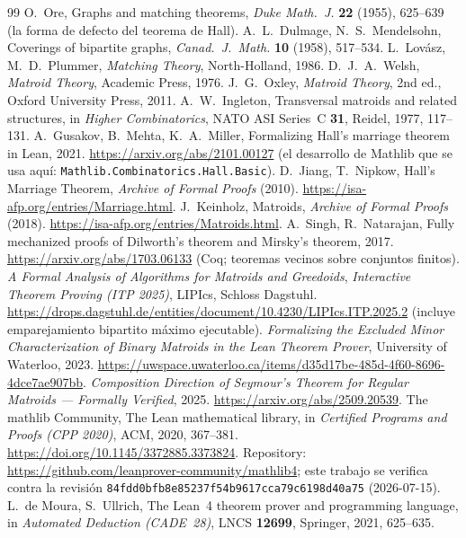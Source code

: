 \documentclass[11pt]{article}
\newcommand{\lean}[1]{\texttt{#1}}
\begin{document}
\begin{thebibliography}{99}
 O.~Ore, Graphs and matching theorems, \emph{Duke Math.\ J.} \textbf{22} (1955),
625--639 (la forma de defecto del teorema de Hall).
 A.~L.~Dulmage, N.~S.~Mendelsohn, Coverings of bipartite graphs, \emph{Canad.\ J.\
Math.} \textbf{10} (1958), 517--534.
 L.~Lov\'asz, M.~D.~Plummer, \emph{Matching Theory}, North-Holland, 1986.
\bibitem{welsh} D.~J.~A.~Welsh, \emph{Matroid Theory}, Academic Press, 1976.
\bibitem{oxley} J.~G.~Oxley, \emph{Matroid Theory}, 2nd ed., Oxford University Press, 2011.
\bibitem{ingleton} A.~W.~Ingleton, Transversal matroids and related structures, in \emph{Higher
Combinatorics}, NATO ASI Series~C \textbf{31}, Reidel, 1977, 117--131.
\bibitem{gusakov} A.~Gusakov, B.~Mehta, K.~A.~Miller, Formalizing Hall's marriage theorem in Lean,
2021. \url{https://arxiv.org/abs/2101.00127} (el desarrollo de Mathlib que se usa aquí:
\lean{Mathlib.Combinatorics.Hall.Basic}).
 D.~Jiang, T.~Nipkow, Hall's Marriage Theorem, \emph{Archive of Formal Proofs}
(2010). \url{https://isa-afp.org/entries/Marriage.html}.
 J.~Keinholz, Matroids, \emph{Archive of Formal Proofs} (2018).
\url{https://isa-afp.org/entries/Matroids.html}.
 A.~Singh, R.~Natarajan, Fully mechanized proofs of Dilworth's theorem and
Mirsky's theorem, 2017. \url{https://arxiv.org/abs/1703.06133} (Coq; teoremas vecinos sobre conjuntos
finitos).
 \emph{A Formal Analysis of Algorithms for Matroids and Greedoids},
\emph{Interactive Theorem Proving (ITP 2025)}, LIPIcs, Schloss Dagstuhl.
\url{https://drops.dagstuhl.de/entities/document/10.4230/LIPIcs.ITP.2025.2} (incluye emparejamiento bipartito
máximo ejecutable).
 \emph{Formalizing the Excluded Minor Characterization of Binary Matroids
in the Lean Theorem Prover}, University of Waterloo, 2023.
\url{https://uwspace.uwaterloo.ca/items/d35d17be-485d-4f60-8696-4dce7ae907bb}.
\bibitem{seymour} \emph{Composition Direction of Seymour's Theorem for Regular Matroids ---
Formally Verified}, 2025. \url{https://arxiv.org/abs/2509.20539}.
\bibitem{mathlib} The mathlib Community, The Lean mathematical library, in \emph{Certified
Programs and Proofs (CPP 2020)}, ACM, 2020, 367--381.
\url{https://doi.org/10.1145/3372885.3373824}. Repository:
\url{https://github.com/leanprover-community/mathlib4}; este trabajo se verifica contra la revisión
\lean{84fdd0bfb8e85237f54b9617cca79c6198d40a75} (2026-07-15).
 L.~de Moura, S.~Ullrich, The Lean~4 theorem prover and programming language, in
\emph{Automated Deduction (CADE~28)}, LNCS \textbf{12699}, Springer, 2021, 625--635.

\end{thebibliography}
\end{document}
